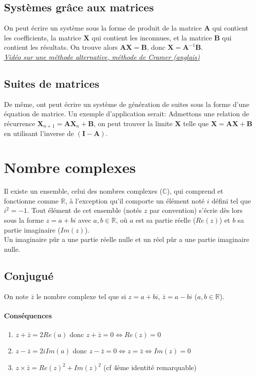 \documentclass{article}
\begin{document}
\subsection{Systèmes grâce aux matrices}
On peut écrire un système sous la forme de produit de la matrice $\mathbf{A}$ qui contient les coefficients, la matrice $\mathbf{X}$ qui contient les inconnues, et la matrice $\mathbf{B}$ qui contient les résultats. On trouve alors $\mathbf{AX} = \mathbf{B}$, donc $\mathbf{X} = \mathbf{A}^{-1}\mathbf{B}$.\\
\break
\href{https://youtu.be/jBsC34PxzoM}{\underline{\textit{Vidéo sur une méthode alternative, méthode de Cramer (anglais)}}}

\subsection{Suites de matrices}
De même, ont peut écrire un système de génération de suites sous la forme d'une équation de matrice. Un exemple d'application serait: Admettons une relation de récurrence $\mathbf{X}_{n+1} = \mathbf{AX}_n+\mathbf{B}$, on peut trouver la limite $\mathbf{X}$ telle que $\mathbf{X} = \mathbf{AX}+\mathbf{B}$ en utilisant l'inverse de $(\mathbf{I}-\mathbf{A})$.


\section{Nombre complexes}
Il existe un ensemble, celui des nombres complexes ($\mathbb{C}$), qui comprend et fonctionne comme $\mathbb{R}$, à l'exception qu'il comporte un élément noté $i$ défini tel que $i^2 = -1$. Tout élément de cet ensemble (notés $z$ par convention) s'écrie dès lors sous la forme $z=a+bi$ avec $a,b\in\mathbb{R}$, où $a$ est sa partie réelle ($Re(z)$) et $b$ sa partie imaginaire ($Im(z)$).\\
Un imaginaire pûr a une partie réelle nulle et un réel pûr a une partie imaginaire nulle.

\subsection{Conjugué}
On note $\bar{z}$ le nombre complexe tel que si $z=a+bi$, $\bar{z}=a-bi$ ($a,b\in\mathbb{R}$).\\
\paragraph{Conséquences}
\begin{enumerate}
	\item $z+\bar{z} = 2Re(a)$ donc $z+\bar{z}=0 \Leftrightarrow  Re(z)=0$
	\item $z-\bar{z} = 2iIm(a)$ donc $z-\bar{z}=0 \Leftrightarrow z=\bar{z} \Leftrightarrow Im(z)=0$
	\item $z\times\bar{z} = Re(z)^2 + Im(z)^2$ (cf 4ème identité remarquable)
\end{enumerate}
\end{document}
